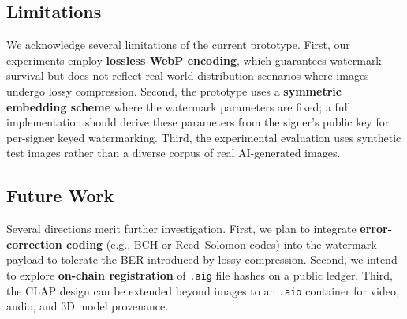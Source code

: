 \documentclass[conference]{IEEEtran}
\begin{document}
\subsection{Limitations}

We acknowledge several limitations of the current prototype.
First, our experiments employ \textbf{lossless WebP encoding}, which
guarantees watermark survival but does not reflect real-world distribution
scenarios where images undergo lossy compression.
Second, the prototype uses a \textbf{symmetric embedding scheme} where the
watermark parameters are fixed; a full implementation should derive these
parameters from the signer's public key for per-signer keyed watermarking.
Third, the experimental evaluation uses synthetic test images rather than
a diverse corpus of real AI-generated images.

\subsection{Future Work}

Several directions merit further investigation.
First, we plan to integrate \textbf{error-correction coding}
(e.g., BCH or Reed–Solomon codes) into the watermark payload to tolerate
the BER introduced by lossy compression.
Second, we intend to explore \textbf{on-chain registration} of
\texttt{.aig} file hashes on a public ledger.
Third, the CLAP design can be extended beyond images to an
\texttt{.aio} container for video, audio, and 3D model provenance.
\end{document}
